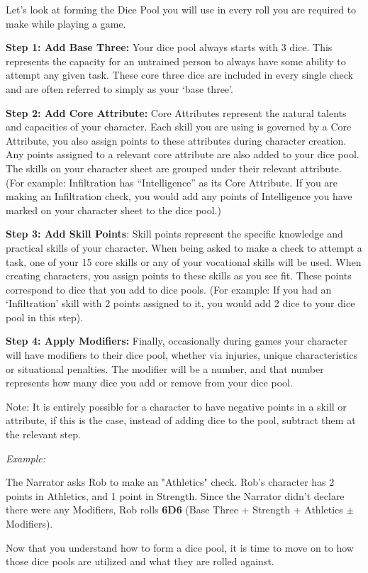 Let’s look at forming the Dice Pool you will use in every roll you are required to make while playing a game.

\textbf{Step 1: Add Base Three:} Your dice pool always starts with 3 dice. This represents the capacity for an untrained person to always have some ability to attempt any given task. These core three dice are included in every single check and are often referred to simply as your ‘base three’.

\textbf{Step 2: Add Core Attribute:} Core Attributes represent the natural talents and capacities of your character. Each skill you are using is governed by a Core Attribute, you also assign points to these attributes during character creation. Any points assigned to a relevant core attribute are also added to your dice pool. The skills on your character sheet are grouped under their relevant attribute. (For example: Infiltration has “Intelligence” as its Core Attribute. If you are making an Infiltration check, you would add any points of Intelligence you have marked on your character sheet to the dice pool.)

\textbf{Step 3: Add Skill Points}: Skill points represent the specific knowledge and practical skills of your character. When being asked to make a check to attempt a task, one of your 15 core skills or any of your vocational skills will be used. When creating characters, you assign points to these skills as you see fit. These points correspond to dice that you add to dice pools. (For example: If you had an ‘Infiltration’ skill with 2 points assigned to it, you would add 2 dice to your dice pool in this step).

\textbf{Step 4: Apply Modifiers:} Finally, occasionally during games your character will have modifiers to their dice pool, whether via injuries, unique characteristics or situational penalties. The modifier will be a number, and that number represents how many dice you add or remove from your dice pool.

Note: It is entirely possible for a character to have negative points in a skill or attribute, if this is the case, instead of adding dice to the pool, subtract them at the relevant step.

\textit{Example:}

\begin{displayquote}
    The Narrator asks Rob to make an "Athletics" check. Rob's character has 2 points in Athletics, and 1 point in Strength.  Since the Narrator didn't declare there were any Modifiers, Rob rolls \textbf{6D6} (Base Three + Strength + Athletics $\pm$ Modifiers).
\end{displayquote}

Now that you understand how to form a dice pool, it is time to move on to how those dice pools are utilized and what they are rolled against.